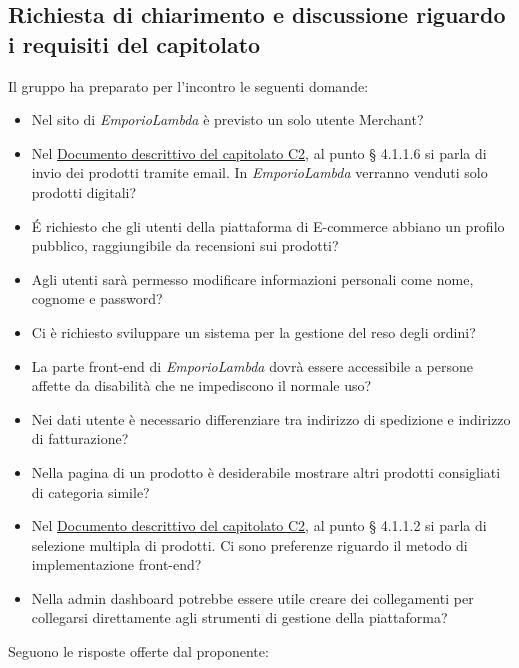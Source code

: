 \subsection{Richiesta di chiarimento e discussione riguardo i requisiti del capitolato}
Il gruppo ha preparato per l'incontro le seguenti domande:
\begin{itemize}
\item Nel sito di \textit{EmporioLambda} è previsto un solo utente Merchant?
\item Nel \href{https://www.math.unipd.it/~tullio/IS-1/2020/Progetto/C2.pdf}{Documento descrittivo del capitolato C2}, al punto § 4.1.1.6 si parla di invio dei prodotti tramite email. In \textit{EmporioLambda} verranno venduti solo prodotti digitali?
\item É richiesto che gli utenti della piattaforma di E-commerce abbiano un profilo pubblico, raggiungibile da recensioni sui prodotti?
\item Agli utenti sarà permesso modificare informazioni personali come nome, cognome e password?
\item Ci è richiesto sviluppare un sistema per la gestione del reso degli ordini?
\item La parte front-end di \textit{EmporioLambda} dovrà essere accessibile a persone affette da disabilità che ne impediscono il normale uso?
\item Nei dati utente è necessario differenziare tra indirizzo di spedizione e indirizzo di fatturazione?
\item Nella pagina di un prodotto è desiderabile mostrare altri prodotti consigliati di categoria simile?
\item Nel \href{https://www.math.unipd.it/~tullio/IS-1/2020/Progetto/C2.pdf}{Documento descrittivo del capitolato C2}, al punto § 4.1.1.2 si parla di selezione multipla di prodotti. Ci sono preferenze riguardo il metodo di implementazione front-end?
\item Nella admin dashboard potrebbe essere utile creare dei collegamenti per collegarsi direttamente agli strumenti di gestione della piattaforma?
\end{itemize}
Seguono le risposte offerte dal proponente:
